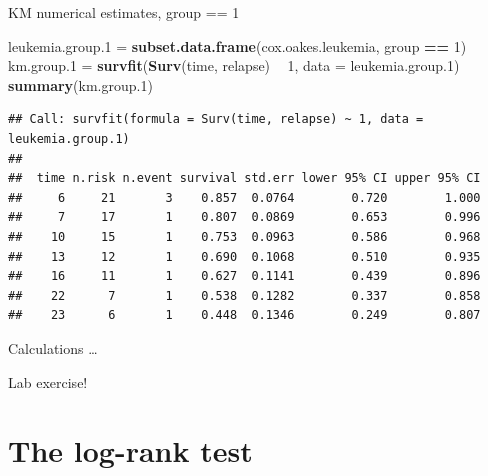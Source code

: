 \documentclass[ignorenonframetext,]{beamer}
\newenvironment{Shaded}{\begin{snugshade}}{\end{snugshade}}
\newcommand{\DataTypeTok}[1]{\textcolor[rgb]{0.13,0.29,0.53}{#1}}
\newcommand{\DecValTok}[1]{\textcolor[rgb]{0.00,0.00,0.81}{#1}}
\newcommand{\FloatTok}[1]{\textcolor[rgb]{0.00,0.00,0.81}{#1}}
\newcommand{\KeywordTok}[1]{\textcolor[rgb]{0.13,0.29,0.53}{\textbf{#1}}}
\newcommand{\NormalTok}[1]{#1}
\newcommand{\OperatorTok}[1]{\textcolor[rgb]{0.81,0.36,0.00}{\textbf{#1}}}
\newcommand{\StringTok}[1]{\textcolor[rgb]{0.31,0.60,0.02}{#1}}
\begin{document}
\begin{frame}[fragile]{%
\protect\hypertarget{km-numerical-estimates-group-1}{%
KM numerical estimates, group == 1}}

\scriptsize

\begin{Shaded}
\begin{Highlighting}[]
\NormalTok{leukemia.group}\FloatTok{.1}\NormalTok{ =}\StringTok{ }
\StringTok{  }\KeywordTok{subset.data.frame}\NormalTok{(cox.oakes.leukemia, group }\OperatorTok{==}\StringTok{ }\DecValTok{1}\NormalTok{)}
\NormalTok{km.group}\FloatTok{.1}\NormalTok{ =}\StringTok{ }\KeywordTok{survfit}\NormalTok{(}\KeywordTok{Surv}\NormalTok{(time, relapse) }\OperatorTok{~}\StringTok{ }\DecValTok{1}\NormalTok{, }
                     \DataTypeTok{data =}\NormalTok{ leukemia.group}\FloatTok{.1}\NormalTok{)}
\KeywordTok{summary}\NormalTok{(km.group}\FloatTok{.1}\NormalTok{)}
\end{Highlighting}
\end{Shaded}

\begin{verbatim}
## Call: survfit(formula = Surv(time, relapse) ~ 1, data = leukemia.group.1)
## 
##  time n.risk n.event survival std.err lower 95% CI upper 95% CI
##     6     21       3    0.857  0.0764        0.720        1.000
##     7     17       1    0.807  0.0869        0.653        0.996
##    10     15       1    0.753  0.0963        0.586        0.968
##    13     12       1    0.690  0.1068        0.510        0.935
##    16     11       1    0.627  0.1141        0.439        0.896
##    22      7       1    0.538  0.1282        0.337        0.858
##    23      6       1    0.448  0.1346        0.249        0.807
\end{verbatim}

\normalsize

\end{frame}

\begin{frame}{%
\protect\hypertarget{calculations}{%
Calculations \ldots}}

Lab exercise!

\end{frame}

\hypertarget{the-log-rank-test}{%
\section{The log-rank test}\label{the-log-rank-test}}
\end{document}
